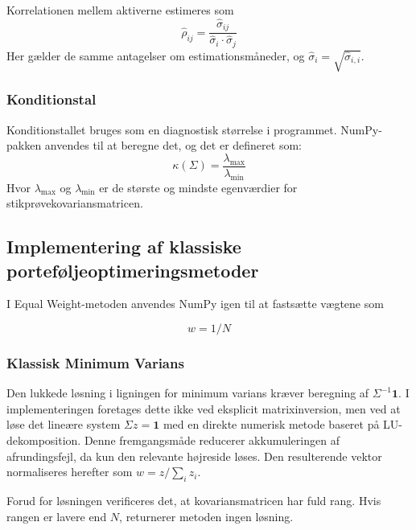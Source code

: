 \documentclass[../main.tex]{subfiles}
\begin{document}
Korrelationen mellem aktiverne estimeres som
\begin{equation}
    \hat{\rho}_{ij} = \frac{\hat{\sigma}_{ij}}{\hat{\sigma}_i \cdot \hat{\sigma}_j}
    \label{eq:sample_correlation}
\end{equation} 
Her gælder de samme antagelser om estimationsmåneder, og $\hat{\sigma}_i = \sqrt{\hat{\sigma}_{i,i}}$.

\subsubsection{Konditionstal}
Konditionstallet bruges som en diagnostisk størrelse i programmet. NumPy-pakken anvendes til at beregne det, og det er defineret som:
\begin{equation}
    \kappa(\Sigma) = \frac{\lambda_{\max}}{\lambda_{\min}}
    \label{eq:condition_number}
\end{equation}
Hvor $\lambda_{\max}$ og $\lambda_{\min}$ er de største og mindste egenværdier for stikprøvekovariansmatricen.



\subsection{Implementering af klassiske porteføljeoptimeringsmetoder}

I Equal Weight-metoden anvendes NumPy igen til at fastsætte vægtene som

\begin{equation}
    w = 1/N
    \label{eq:equal_weight_implementation}
\end{equation}


\subsubsection{Klassisk Minimum Varians}

Den lukkede løsning i ligningen for minimum varians kræver beregning af $\Sigma^{-1}\mathbf{1}$. I implementeringen foretages dette ikke ved eksplicit matrixinversion, men ved at løse det lineære system $\Sigma z = \mathbf{1}$ med en direkte numerisk metode baseret på LU-dekomposition. Denne fremgangsmåde reducerer akkumuleringen af afrundingsfejl, da kun den relevante højreside løses. Den resulterende vektor normaliseres herefter som $w = z / \sum_i z_i$.

Forud for løsningen verificeres det, at kovariansmatricen har fuld rang. Hvis rangen er lavere end $N$, returnerer metoden ingen løsning.
\end{document}
